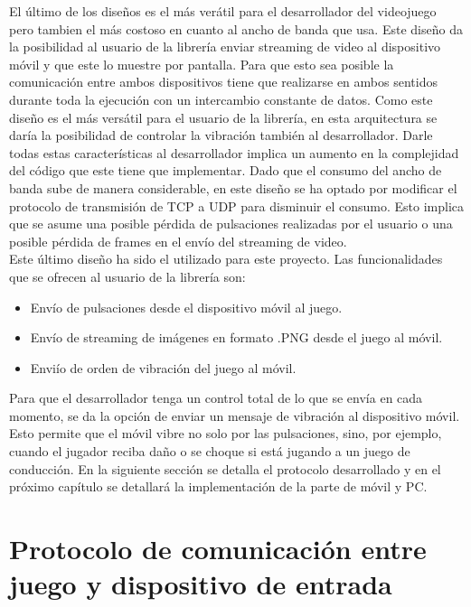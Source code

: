 El \'ultimo de los dise\~nos es el m\'as ver\'atil para el desarrollador del videojuego pero tambien el m\'as costoso en cuanto al ancho de banda que usa. Este dise\~no da la posibilidad al usuario de la librer\'ia enviar streaming de video al dispositivo m\'ovil y que este lo muestre por pantalla. Para que esto sea posible la comunicaci\'on entre ambos dispositivos tiene que realizarse en ambos sentidos durante toda la ejecuci\'on con un intercambio constante de datos. Como este dise\~no es el m\'as vers\'atil para el usuario de la librer\'ia, en esta arquitectura se dar\'ia la posibilidad de controlar la vibraci\'on tambi\'en al desarrollador. Darle todas estas caracter\'isticas al desarrollador implica un aumento en la complejidad del c\'odigo que este tiene que implementar. Dado que el consumo del ancho de banda sube de manera considerable, en este dise\~no se ha optado por modificar el protocolo de transmisi\'on de TCP a UDP para disminuir el consumo. Esto implica que se asume una posible p\'erdida de pulsaciones realizadas por el usuario o una posible p\'erdida de frames en el env\'io del streaming de video.\\

Este \'ultimo dise\~no ha sido el utilizado para este proyecto. Las funcionalidades que se ofrecen al usuario de la librer\'ia son:

\begin {itemize}
\item Env\'io de pulsaciones desde el dispositivo m\'ovil al juego.
\item Env\'io de streaming de im\'agenes en formato .PNG desde el juego al m\'ovil.
\item Envi\'io de orden de vibraci\'on del juego al m\'ovil.
\end {itemize}

Para que el desarrollador tenga un control total de lo que se env\'ia en cada momento, se da la opci\'on de enviar un mensaje de vibraci\'on al dispositivo m\'ovil. Esto permite que el m\'ovil vibre no solo por las pulsaciones, sino, por ejemplo, cuando el jugador reciba da\~no o se choque si est\'a jugando a un juego de conducci\'on. En la siguiente secci\'on se detalla el protocolo desarrollado y en el pr\'oximo cap\'itulo se detallar\'a la implementaci\'on de la parte de m\'ovil y PC.


\section{Protocolo de comunicaci\'on entre juego y dispositivo de entrada}

